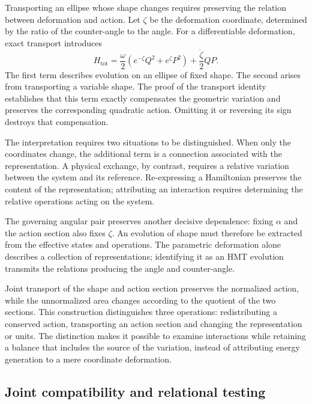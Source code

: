 Transporting an ellipse whose shape changes requires preserving the relation
between deformation and action. Let $\zeta$ be the deformation coordinate,
determined by the ratio of the counter-angle to the angle. For a
differentiable deformation, exact transport introduces
\begin{equation}
 H_{\mathrm{tot}}
 =\frac{\omega}{2}
   \left(e^{-\zeta}Q^2+e^\zeta P^2\right)
  +\frac{\dot\zeta}{2}QP.
 \label{eq:narrativa-hamiltoniano-transporte}
\end{equation}
The first term describes evolution on an ellipse of fixed shape.
The second arises from transporting a variable shape. The proof
of the transport identity establishes that this term exactly compensates
the geometric variation and preserves the corresponding quadratic
action. Omitting it or reversing its sign destroys that
compensation.

The interpretation requires two situations to be distinguished. When
only the coordinates change, the additional term is a connection associated with the
representation. A physical exchange, by contrast, requires a relative variation
between the system and its reference. Re-expressing a Hamiltonian
preserves the content of the representation; attributing an interaction
requires determining the relative operations acting on the system.

The governing angular pair preserves another decisive dependence: fixing $\alpha$
and the action section also fixes $\zeta$. An evolution of shape
must therefore be extracted from the effective states and operations. The
parametric deformation alone describes a collection of representations;
identifying it as an HMT evolution transmits the relations producing
the angle and counter-angle.

Joint transport of the shape and action section preserves the
normalized action, while the unnormalized area changes according to
the quotient of the two sections. This construction distinguishes three
operations: redistributing a conserved action, transporting an action
section and changing the representation or units. The distinction makes it possible to
examine interactions while retaining a balance that includes the source of the
variation, instead of attributing energy generation to a mere coordinate
deformation.

\subsection{Joint compatibility and relational testing}
\label{subsec:narrativa-compatibilidad-conjunta}

